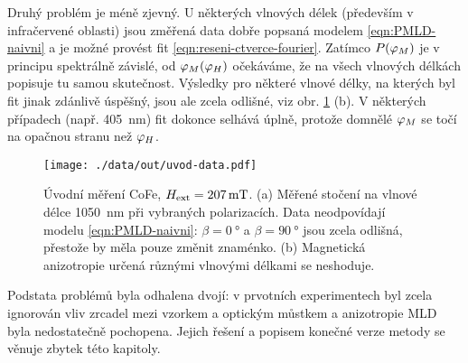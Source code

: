 Druhý problém je méně zjevný.
U některých vlnových délek (především v infračervené oblasti) jsou změřená data dobře popsaná modelem \eqref{eqn:PMLD-naivni} a je možné provést fit \eqref{eqn:reseni-ctverce-fourier}.
Zatímco $P(\varphi_M)$ je v principu spektrálně závislé, od $\varphi_M(\varphi_H)$ očekáváme, že na všech vlnových délkách popisuje tu samou skutečnost.
Výsledky pro některé vlnové délky, na kterých byl fit jinak zdánlivě úspěšný, jsou ale zcela odlišné, viz obr. \ref{fig:g-uvod-data} (b).
V některých případech (např. \SI{405}{\nano\meter}) fit dokonce selhává úplně, protože domnělé $\varphi_M$ se točí na opačnou stranu než $\varphi_H$.

\begin{figure}[htbp]
    \centering
    \texttt{[image: ./data/out/uvod-data.pdf]}
    \caption{Úvodní měření CoFe, $H_\textrm{ext}=\SI{207}{\milli\tesla}$. (a) Měřené stočení na vlnové délce \SI{1050}{\nano\meter} při vybraných polarizacích. Data neodpovídají modelu \eqref{eqn:PMLD-naivni}: $\beta=\SI{0}{\degree}$ a $\beta=\SI{90}{\degree}$ jsou zcela odlišná, přestože by měla pouze změnit znaménko. (b) Magnetická anizotropie určená různými vlnovými délkami se neshoduje.}
    \label{fig:g-uvod-data}
\end{figure}

Podstata problémů byla odhalena dvojí: v prvotních experimentech byl zcela ignorován vliv zrcadel mezi vzorkem a optickým můstkem a anizotropie MLD byla nedostatečně pochopena.
Jejich řešení a popisem konečné verze metody se věnuje zbytek této kapitoly.
